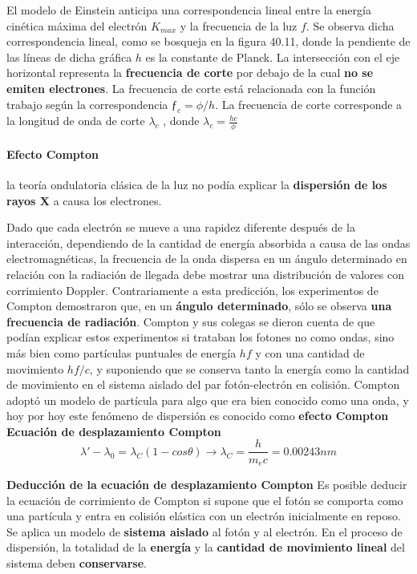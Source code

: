 \documentclass[10pt]{article}
\begin{document}
El modelo de Einstein anticipa una correspondencia lineal entre la energía cinética máxima del electrón $K_{max}$ y la frecuencia de la luz $f$.  Se observa dicha correspondencia lineal, como se bosqueja en la figura 40.11, donde la pendiente de las líneas de dicha gráfica $h$ es la constante de Planck. La intersección con el eje horizontal representa la \textbf{frecuencia de corte} por debajo de la cual \textbf{no se emiten electrones}. La frecuencia de corte está relacionada con la función trabajo según la correspondencia $ƒ_c=  \phi/h$. La frecuencia de corte corresponde a la longitud de onda de corte $\lambda_c$ , donde $\lambda_c = \frac{hc}{\phi}$


\paragraph{Efecto Compton}

la teoría ondulatoria clásica de la luz no podía explicar la \textbf{dispersión de los rayos X} a causa los electrones.

Dado que cada electrón se mueve a una rapidez diferente después de la interacción, dependiendo de la cantidad de energía absorbida a causa de las ondas electromagnéticas, la frecuencia de la onda dispersa en un ángulo determinado en relación con la radiación de llegada debe mostrar una distribución de valores con corrimiento Doppler. Contrariamente a esta predicción, los experimentos de Compton demostraron que, en un \textbf{ángulo determinado}, sólo se observa \textbf{una frecuencia de radiación}. Compton y sus colegas se dieron cuenta de que podían explicar estos experimentos si trataban los fotones no como ondas, sino más bien como partículas puntuales de energía $hf$ y con una cantidad de movimiento $hf/c$, y suponiendo que se conserva tanto la energía como la cantidad de movimiento en el sistema aislado del par fotón-electrón en colisión. Compton adoptó un modelo de partícula para algo que era bien conocido como una onda, y hoy por hoy este fenómeno de dispersión es conocido como \textbf{efecto Compton}\\
\linebreak
\textbf{Ecuación de desplazamiento Compton}
\begin{equation*}
	\lambda' - \lambda_0 = \lambda_C(1-cos\theta) \rightarrow \lambda_C = \dfrac{h}{m_e c} = 0.00243nm
\end{equation*}

\textbf{Deducción de la ecuación de desplazamiento Compton}
Es posible deducir la ecuación de corrimiento de Compton si supone que el fotón se comporta como una partícula y entra en colisión elástica con un electrón inicialmente en reposo. Se aplica un modelo de \textbf{sistema aislado} al fotón y al electrón. En el proceso de dispersión, la totalidad de la \textbf{energía} y la \textbf{cantidad de movimiento lineal} del sistema deben \textbf{conservarse}. 
\end{document}

